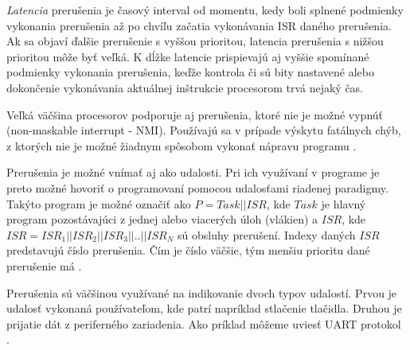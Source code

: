 \textit{Latencia} prerušenia je časový interval od momentu, kedy boli splnené podmienky vykonania prerušenia až po chvíľu začatia vykonávania ISR daného prerušenia.
Ak sa objaví ďalšie prerušenie s vyššou prioritou, latencia prerušenia s nižšou prioritou môže byť veľká.
K dĺžke latencie prispievajú aj vyššie spomínané podmienky vykonania prerušenia,
keďže kontrola či sú bity nastavené alebo dokončenie vykonávania aktuálnej inštrukcie procesorom trvá nejaký čas. \par
Veľká väčšina procesorov podporuje aj prerušenia, ktoré nie je možné vypnúť (non-maskable interrupt - \acrshort{NMI}).
Používajú sa v prípade výskytu fatálnych chýb, z ktorých nie je možné žiadnym spôsobom vykonať nápravu programu
\cite{regehrSafeStructuredUse2007}. \par
Prerušenia je možné vnímať aj ako udalosti. Pri ich využívaní v programe je preto možné hovoriť o programovaní pomocou udalosťami riadenej paradigmy.
Takýto program je možné označiť ako \begin{math}P=Task || ISR\end{math}, kde \begin{math}Task\end{math} je hlavný program pozostávajúci z
jednej alebo viacerých úloh (vlákien) a  \begin{math}ISR\end{math}, kde \begin{math}ISR=ISR_1||ISR_2||ISR_3||..||ISR_N\end{math} sú obsluhy prerušení.
Indexy daných \begin{math}ISR\end{math} predstavujú číslo prerušenia.
Čím je číslo väčšie, tým menšiu prioritu dané prerušenie má \cite{wangAutomaticDetectionValidation2017}. \par
Prerušenia sú väčšinou využívané na indikovanie dvoch typov udalostí.  Prvou je udalosť vykonaná používateľom, kde patrí napríklad stlačenie tlačidla.
Druhou je prijatie dát z periferného zariadenia. Ako príklad môžeme uviesť UART protokol \cite{wangAutomaticDetectionValidation2017}.
